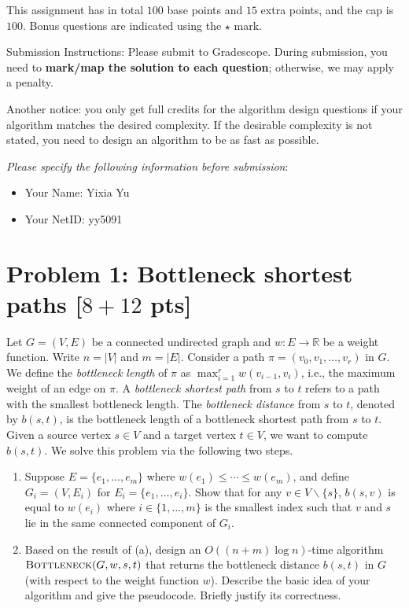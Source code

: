 \documentclass[letterpaper, 11pt]{article}
\newcommand{\1}{\mathds{1}}	%
\theoremstyle{definition}
\newcommand{\problem}[1]{\section*{Problem #1}}
\begin{document}
This assignment has in total $100$ base points and $15$ extra points, and the cap is $100$.
Bonus questions are indicated using the $\star$ mark.

Submission Instructions: Please submit to Gradescope. During submission, you need to \textbf{mark/map the solution to each question}; otherwise, we may apply a penalty. 

Another notice: you only get full credits for the algorithm design questions if your algorithm matches the desired complexity. If the desirable complexity is not stated, you need to design an algorithm to be as fast as possible.

\textit{Please specify the following information before submission}:
\begin{itemize}
    \item Your Name: Yixia Yu %
    \item Your NetID: yy5091%
\end{itemize}
\clearpage


\problem{1: Bottleneck shortest paths [$8+12$ pts]} 
Let $G = (V,E)$ be a connected undirected graph and $w:E \rightarrow \mathbb{R}$ be a weight function.
Write $n = |V|$ and $m = |E|$.
Consider a path $\pi = (v_0,v_1,\dots,v_r)$ in $G$.
We define the \textit{bottleneck length} of $\pi$ as $\max_{i=1}^r w(v_{i-1},v_i)$, i.e., the maximum weight of an edge on $\pi$.
A \textit{bottleneck shortest path} from $s$ to $t$ refers to a path with the smallest bottleneck length.
The \textit{bottleneck distance} from $s$ to $t$, denoted by $b(s,t)$, is the bottleneck length of a bottleneck shortest path from $s$ to $t$.
Given a source vertex $s \in V$ and a target vertex $t \in V$, we want to compute $b(s,t)$.
We solve this problem via the following two steps.
\begin{enumerate}
    \item Suppose $E = \{e_1,\dots,e_m\}$ where $w(e_1) \leq \cdots \leq w(e_m)$, and define $G_i = (V,E_i)$ for $E_i = \{e_1,\dots,e_i\}$.
    Show that for any $v \in V \backslash \{s\}$, $b(s,v)$ is equal to $w(e_i)$ where $i \in \{1,\dots,m\}$ is the smallest index such that $v$ and $s$ lie in the same connected component of $G_i$.
    
    \item Based on the result of (a), design an $O((n+m)\log n)$-time algorithm $\textsc{Bottleneck}(G,w,s,t)$ that returns the bottleneck distance $b(s,t)$ in $G$ (with respect to the weight function $w$).
    Describe the basic idea of your algorithm and give the pseudocode.
    Briefly justify its correctness.
\end{enumerate}
\end{document}
